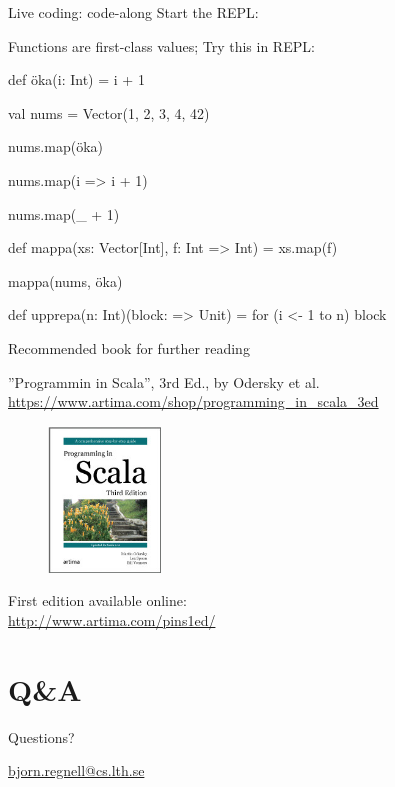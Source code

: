 \documentclass{lecturenotes}
\begin{document}
\begin{Slide}{Live coding: code-along}
Start the REPL:

\end{Slide}


\begin{Slide}{Functions are first-class values; Try this in REPL:}
\begin{REPL}[basicstyle=\color{white}\ttfamily\fontsize{8.5}{10}\selectfont]
def öka(i: Int) = i + 1

val nums = Vector(1, 2, 3, 4, 42)

nums.map(öka)

nums.map(i => i + 1)

nums.map(_ + 1)

def mappa(xs: Vector[Int], f: Int => Int) = xs.map(f)  

mappa(nums, öka)

def upprepa(n: Int)(block: => Unit) = for (i <- 1 to n) block
\end{REPL}

\end{Slide}




\begin{Slide}{Recommended book for further reading}

\begin{center}
''Programmin in Scala'', 3rd Ed., by Odersky et al.\\
{\small\url{https://www.artima.com/shop/programming\_in\_scala\_3ed}}
\begin{figure}
\includegraphics[width=3cm]{img/pinsbook}
\end{figure}
First edition available online:\\ {\small\url{http://www.artima.com/pins1ed/}}
\end{center}
\end{Slide}

\section*{Q\&A}
\begin{Slide}{Questions?}
\begin{center}
\url{bjorn.regnell@cs.lth.se}
\end{center}
\end{Slide}
\end{document}
